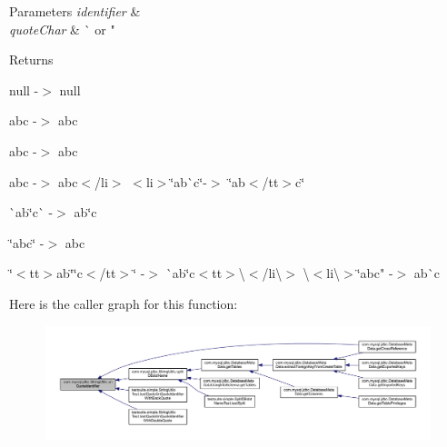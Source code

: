 \begin{DoxyParams}{Parameters}
{\em identifier} & \\
\hline
{\em quote\+Char} & \`{} or " \\
\hline
\end{DoxyParams}
\begin{DoxyReturn}{Returns}

\begin{DoxyItemize}
\item null -\/$>$ null 
\item abc -\/$>$ abc 
\item {\ttfamily abc} -\/$>$ abc 
\item {\ttfamily ab}{\ttfamily c} -\/$>$ ab{\ttfamily c$<$/li$>$ $<$li$>$}\char`\"{}ab\`{}c\char`\"{}{\ttfamily -\/$>$ \char`\"{}ab$<$/tt$>$c\char`\"{} }
\item {\ttfamily \`{}ab\char`\"{}c\`{} -\/$>$ ab\char`\"{}c }
\item {\ttfamily \char`\"{}abc\char`\"{} -\/$>$ abc }
\item {\ttfamily \char`\"{}$<$tt$>$ab\char`\"{}\char`\"{}c$<$/tt$>$\char`\"{} -\/$>$ \`{}ab\char`\"{}c$<$tt$>$\textbackslash{}$<$/li\textbackslash{}$>$
        \textbackslash{}$<$li\textbackslash{}$>$\char`\"{}ab}c" -\/$>$ ab\`{}c 
\end{DoxyItemize}
\end{DoxyReturn}
Here is the caller graph for this function\+:
\nopagebreak
\begin{figure}[H]
\begin{center}
\leavevmode
\includegraphics[width=350pt]{classcom_1_1mysql_1_1jdbc_1_1_string_utils_a2b5fec0251d326e70298ce197422e5cc_icgraph}
\end{center}
\end{figure}
\mbox{\label{classcom_1_1mysql_1_1jdbc_1_1_string_utils_a20d8547a5e865d12bac8f9ef9ba00834}} 
